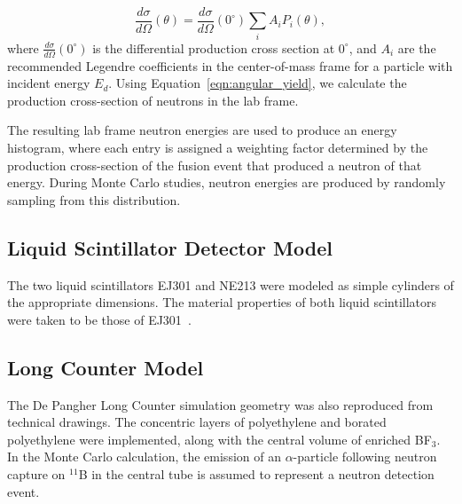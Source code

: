 \begin{equation}\label{eqn:angular_yield}
\frac{d \sigma}{d \Omega}(\theta) = \frac{d \sigma}{d \Omega}(0^{\circ}) \sum\limits_{i} A_i P_i(\theta)  ,
\end{equation}
where $\frac{d \sigma}{d \Omega}(0^{\circ})$ is the differential production cross section at $0^{\circ}$, and $A_i$ are the recommended Legendre coefficients in the center-of-mass frame for a particle with incident energy $E_d$. Using Equation~\eqref{eqn:angular_yield}, we calculate the production cross-section of neutrons in the lab frame.

The resulting lab frame neutron energies are used to produce an energy histogram, where each entry is assigned a weighting factor determined by the production cross-section of the fusion event that produced a neutron of that energy. During Monte Carlo studies, neutron energies are produced by randomly sampling from this distribution.


\subsection{Liquid Scintillator Detector Model}

The two liquid scintillators EJ301 and NE213 were modeled as simple cylinders of the appropriate dimensions. The material properties of both liquid scintillators were taken to be those of EJ301~\cite{Eljen}.

\subsection{Long Counter Model}

The De Pangher Long Counter simulation geometry was also reproduced from technical drawings. The concentric layers of polyethylene and borated polyethylene were implemented, along with the central volume of enriched BF$_3$. In the Monte Carlo calculation, the emission of an $\alpha$-particle following neutron capture on $^{11}$B in the central tube is assumed to represent a neutron detection event.

